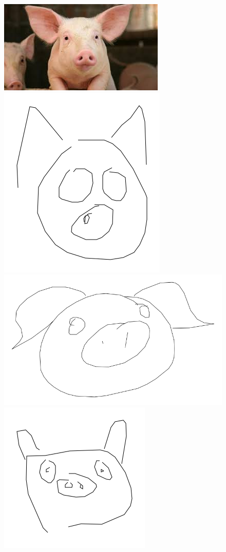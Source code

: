 \documentclass{article}
\begin{document}
\begin{figure}[h]
\centering
\includegraphics[scale=0.2]{images/pig.jpg}
\includegraphics[scale=0.15]{images/pig00008.png}
\includegraphics[scale=0.1]{images/pig00039.png}
\includegraphics[scale=0.15]{images/pig00161.png}

\end{figure}
\end{document}
